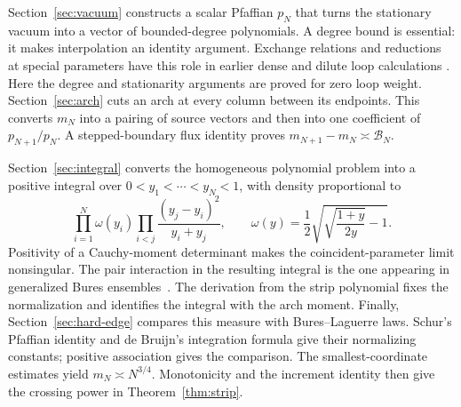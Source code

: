 Section~\ref{sec:vacuum} constructs a scalar Pfaffian $p_N$ that turns
the stationary vacuum into a vector of bounded-degree polynomials.
A degree bound is essential: it makes interpolation an identity
argument. Exchange relations and reductions at special parameters
have this role in earlier dense and dilute loop calculations
\cite{DiFrancescoZinnJustin2005,GarbaliNienhuis2017Ground,GarbaliNienhuis2017Sum}.
Here the degree and stationarity arguments are proved for zero loop
weight.
Section~\ref{sec:arch} cuts an arch at every column between its
endpoints. This converts $m_N$ into a pairing of source vectors and
then into one coefficient of $p_{N+1}/p_N$. A stepped-boundary flux
identity proves $m_{N+1}-m_N\asymp\mathcal B_N$.

Section~\ref{sec:integral} converts the homogeneous polynomial problem
into a positive integral over $0<y_1<\cdots<y_N<1$, with density
proportional to
\[
 \prod_{i=1}^N\omega(y_i)
 \prod_{i<j}\frac{(y_j-y_i)^2}{y_i+y_j},\qquad
 \omega(y)=\frac12\sqrt{\sqrt{\frac{1+y}{2y}}-1}.
\]
Positivity of a Cauchy-moment determinant makes the coincident-parameter
limit nonsingular.
The pair interaction in the resulting integral is the one appearing in
generalized Bures ensembles~\cite{ForresterKieburg2016}.
The derivation from the strip polynomial fixes the normalization and
identifies the integral with the arch moment. Finally,
Section~\ref{sec:hard-edge} compares this measure with Bures--Laguerre
laws. Schur's Pfaffian identity and de Bruijn's integration formula
give their normalizing constants; positive association gives the
comparison. The smallest-coordinate estimates yield
$m_N\asymp N^{3/4}$. Monotonicity and the increment identity then give
the crossing power in Theorem~\ref{thm:strip}.
